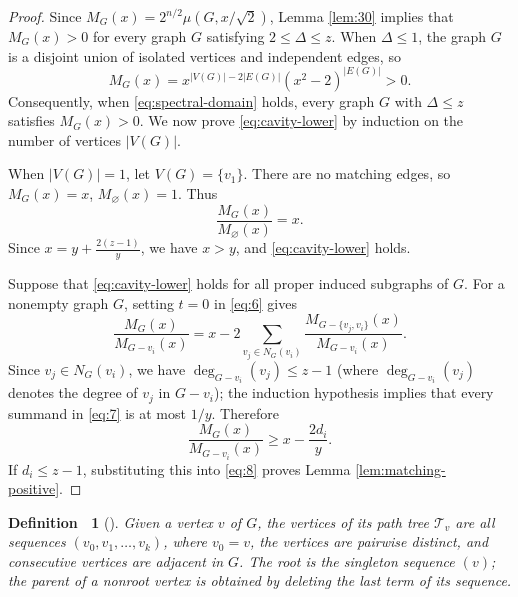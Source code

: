 \documentclass[11pt, a4paper]{article}
\theoremstyle{plain}
\newtheorem{defi}{Definition\ }[section]
\begin{document}
\begin{proof}
Since $M_G(x)=2^{n/2}\mu(G,x/\sqrt2)$,
Lemma \ref{lem:30} implies that $M_G(x)>0$ for every graph $G$ satisfying $2 \leq \Delta \leq z$.
When $\Delta \le1$, the graph $G$ is a disjoint union of isolated vertices and independent edges, so
\[
M_G(x)=x^{|V(G)|-2|E(G)|}(x^2-2)^{|E(G)|}>0.
\]
Consequently, when \eqref{eq:spectral-domain} holds, every graph $G$ with $\Delta \leq z$
satisfies $M_G(x)>0$.
We now prove \eqref{eq:cavity-lower} by induction on the number of vertices $|V(G)|$.

When $|V(G)|=1$, let $V(G)=\{v_1\}$. There are no matching edges, so
$M_G(x)=x$, $M_\varnothing(x)=1$.
Thus
\[
\frac{M_G(x)}{M_\varnothing(x)}=x.
\]
Since $x=y+\frac{2(z-1)}y$, we have $x>y$, and \eqref{eq:cavity-lower} holds.

Suppose that \eqref{eq:cavity-lower} holds for all proper induced subgraphs of $G$.
For a nonempty graph $G$, setting $t=0$ in \eqref{eq:6} gives
\begin{equation}\label{eq:7}
 \frac{M_G(x)}{M_{G-v_i}(x)}
 =x-2\sum_{v_j\in N_G(v_i)}
       \frac{M_{G-\{v_j,v_i\}}(x)}{M_{G-v_i}(x)}.
\end{equation}
Since $v_j\in N_G(v_i)$,
we have $\deg_{G-v_i}(v_j)\leq z-1$ (where $\deg_{G-v_i}(v_j)$ denotes
the degree of $v_j$ in $G-v_i$);
the induction hypothesis implies that every summand in \eqref{eq:7} is at most $1/y$.
Therefore
\begin{equation}\label{eq:8}
 \frac{M_G(x)}{M_{G-v_i}(x)}
 \geq x-\frac{2d_i}y.
\end{equation}
If $d_i\leq z-1$, substituting this into \eqref{eq:8} proves Lemma \ref{lem:matching-positive}.
\end{proof}

\begin{defi}[\cite{Godsil1981}]
Given a vertex $v$ of $G$, the vertices of its path tree $\mathcal{T}_v$ are all sequences
$(v_0,v_1,\ldots,v_k)$, where $v_0=v$, the vertices are pairwise distinct, and consecutive vertices are adjacent in $G$.
The root is the singleton sequence $(v)$; the parent of a nonroot vertex is obtained by deleting the last term of its sequence.
\end{defi}
\end{document}
